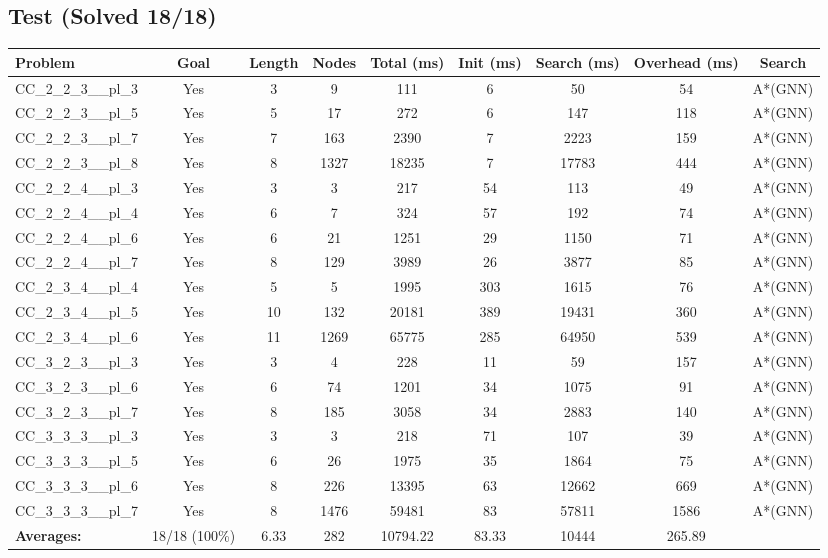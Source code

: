 \documentclass{article}
\begin{document}
\subsection*{Test (Solved 18/18)}
\begin{tabular}{lcccccccc}
\toprule
Problem & Goal & Length & Nodes & Total (ms) & Init (ms) & Search (ms) & Overhead (ms) & Search \\
\midrule
CC\_2\_2\_3\_\_pl\_3 & Yes & 3 & 9 & 111 & 6 & 50 & 54 & A*(GNN) \\
CC\_2\_2\_3\_\_pl\_5 & Yes & 5 & 17 & 272 & 6 & 147 & 118 & A*(GNN) \\
CC\_2\_2\_3\_\_pl\_7 & Yes & 7 & 163 & 2390 & 7 & 2223 & 159 & A*(GNN) \\
CC\_2\_2\_3\_\_pl\_8 & Yes & 8 & 1327 & 18235 & 7 & 17783 & 444 & A*(GNN) \\
CC\_2\_2\_4\_\_pl\_3 & Yes & 3 & 3 & 217 & 54 & 113 & 49 & A*(GNN) \\
CC\_2\_2\_4\_\_pl\_4 & Yes & 6 & 7 & 324 & 57 & 192 & 74 & A*(GNN) \\
CC\_2\_2\_4\_\_pl\_6 & Yes & 6 & 21 & 1251 & 29 & 1150 & 71 & A*(GNN) \\
CC\_2\_2\_4\_\_pl\_7 & Yes & 8 & 129 & 3989 & 26 & 3877 & 85 & A*(GNN) \\
CC\_2\_3\_4\_\_pl\_4 & Yes & 5 & 5 & 1995 & 303 & 1615 & 76 & A*(GNN) \\
CC\_2\_3\_4\_\_pl\_5 & Yes & 10 & 132 & 20181 & 389 & 19431 & 360 & A*(GNN) \\
CC\_2\_3\_4\_\_pl\_6 & Yes & 11 & 1269 & 65775 & 285 & 64950 & 539 & A*(GNN) \\
CC\_3\_2\_3\_\_pl\_3 & Yes & 3 & 4 & 228 & 11 & 59 & 157 & A*(GNN) \\
CC\_3\_2\_3\_\_pl\_6 & Yes & 6 & 74 & 1201 & 34 & 1075 & 91 & A*(GNN) \\
CC\_3\_2\_3\_\_pl\_7 & Yes & 8 & 185 & 3058 & 34 & 2883 & 140 & A*(GNN) \\
CC\_3\_3\_3\_\_pl\_3 & Yes & 3 & 3 & 218 & 71 & 107 & 39 & A*(GNN) \\
CC\_3\_3\_3\_\_pl\_5 & Yes & 6 & 26 & 1975 & 35 & 1864 & 75 & A*(GNN) \\
CC\_3\_3\_3\_\_pl\_6 & Yes & 8 & 226 & 13395 & 63 & 12662 & 669 & A*(GNN) \\
CC\_3\_3\_3\_\_pl\_7 & Yes & 8 & 1476 & 59481 & 83 & 57811 & 1586 & A*(GNN) \\
\textbf{Averages:} & 18/18 (100\%) & 6.33 & 282 & 10794.22 & 83.33 & 10444 & 265.89 & \\
\bottomrule
\end{tabular}
\\[0.7cm]
\end{document}
